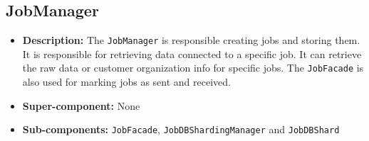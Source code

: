 \documentclass[a4paper,10pt]{article}
\begin{document}
\subsection{JobManager}
\begin{itemize}
    \item \textbf{Description:} The \texttt{JobManager} is responsible creating jobs and storing them. It is responsible for retrieving data connected to a specific job. It can retrieve the raw data or customer organization info for specific jobs. The \texttt{JobFacade} is also used for marking jobs as sent and received.
    \item \textbf{Super-component:} None
    \item \textbf{Sub-components:} \texttt{JobFacade}, \texttt{JobDBShardingManager} and \texttt{JobDBShard}
\end{itemize}
\end{document}
